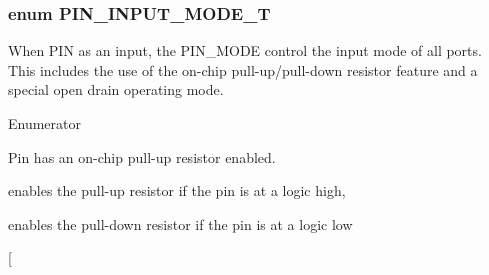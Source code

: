 \hypertarget{group___enumeration_ga9f8f32709b482732d6e377ff26da36ef}{
\subsubsection[{P\-I\-N\-\_\-\-I\-N\-P\-U\-T\-\_\-\-M\-O\-D\-E\-\_\-\-T}]{\setlength{\rightskip}{0pt plus 5cm}enum {\bf P\-I\-N\-\_\-\-I\-N\-P\-U\-T\-\_\-\-M\-O\-D\-E\-\_\-\-T}}}\label{group___enumeration_ga9f8f32709b482732d6e377ff26da36ef}
When P\-I\-N as an input, the P\-I\-N\-\_\-\-M\-O\-D\-E control the input mode of all ports. This includes the use of the on-\/chip pull-\/up/pull-\/down resistor feature and a special open drain operating mode. \begin{Desc}
\item[Enumerator]\par
\begin{description}
\item[{\em 
\hypertarget{group___enumeration_gga9f8f32709b482732d6e377ff26da36efa781a7f23ae9b0dbdc6edfdcfd3be75df}{I\-N\-T\-E\-R\-N\-A\-L\-\_\-\-P\-U\-L\-L\-\_\-\-U\-P}\label{group___enumeration_gga9f8f32709b482732d6e377ff26da36efa781a7f23ae9b0dbdc6edfdcfd3be75df}
}]Pin has an on-\/chip pull-\/up resistor enabled. \item[{\em 
\hypertarget{group___enumeration_gga9f8f32709b482732d6e377ff26da36efa415b70b8108c51e396b88eeeaa0ffb1a}{R\-E\-P\-E\-A\-T\-E\-R}\label{group___enumeration_gga9f8f32709b482732d6e377ff26da36efa415b70b8108c51e396b88eeeaa0ffb1a}
}]enables the pull-\/up resistor if the pin is at a logic high, \par
 enables the pull-\/down resistor if the pin is at a logic low \item[{\em 
}
\end{description}
\end{Desc}
